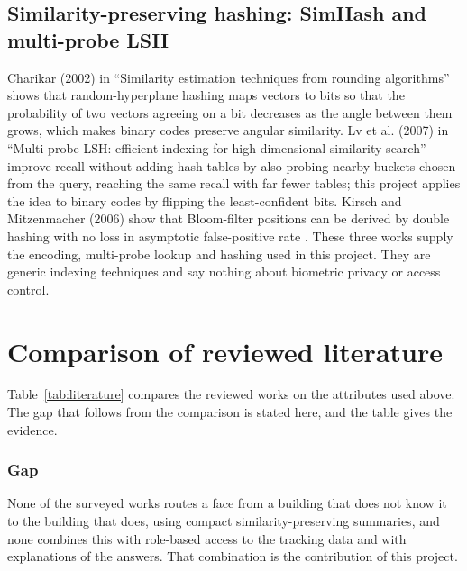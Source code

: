 \documentclass[12pt,a4paper,oneside]{report}
\begin{document}
\subsection{Similarity-preserving hashing: SimHash and multi-probe LSH}
Charikar (2002) in ``Similarity estimation techniques from rounding algorithms'' \cite{ref14} shows that random-hyperplane hashing maps vectors to bits so that the probability of two vectors agreeing on a bit decreases as the angle between them grows, which makes binary codes preserve angular similarity. Lv et al. (2007) in ``Multi-probe LSH: efficient indexing for high-dimensional similarity search'' \cite{ref15} improve recall without adding hash tables by also probing nearby buckets chosen from the query, reaching the same recall with far fewer tables; this project applies the idea to binary codes by flipping the least-confident bits. Kirsch and Mitzenmacher (2006) show that Bloom-filter positions can be derived by double hashing with no loss in asymptotic false-positive rate \cite{ref16}. These three works supply the encoding, multi-probe lookup and hashing used in this project. They are generic indexing techniques and say nothing about biometric privacy or access control.

\section{Comparison of reviewed literature}
Table~\ref{tab:literature} compares the reviewed works on the attributes used above. The gap that follows from the comparison is stated here, and the table gives the evidence.

\subsubsection{Gap}
None of the surveyed works routes a face from a building that does not know it to the building that does, using compact similarity-preserving summaries, and none combines this with role-based access to the tracking data and with explanations of the answers. That combination is the contribution of this project.
\end{document}
